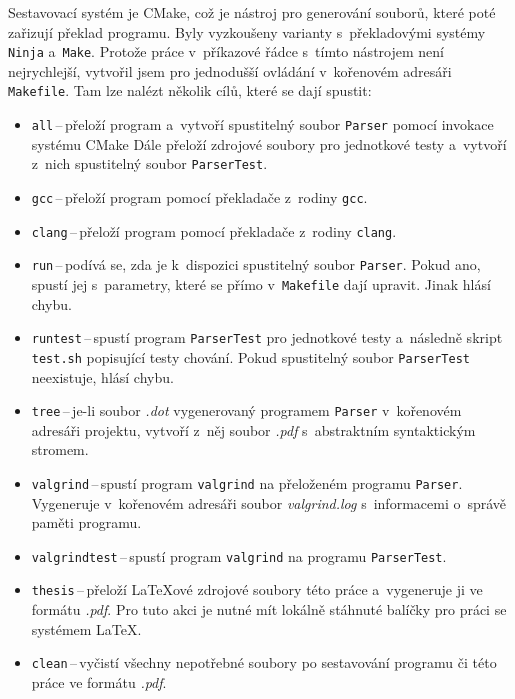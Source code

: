 Sestavovací systém je CMake, což je nástroj pro generování souborů, které poté zařizují překlad programu.
Byly vyzkoušeny varianty s~překladovými systémy \texttt{Ninja} a~\texttt{Make}.
Protože práce v~příkazové řádce s~tímto nástrojem není nejrychlejší, vytvořil jsem pro jednodušší ovládání v~kořenovém adresáři \texttt{Makefile}.
Tam lze nalézt několik cílů, které se dají spustit:
\begin{itemize}
    \item \texttt{all}\,--\,přeloží program a~vytvoří spustitelný soubor \texttt{Parser} pomocí invokace systému CMake
    Dále přeloží zdrojové soubory pro jednotkové testy a~vytvoří z~nich spustitelný soubor \texttt{ParserTest}.
    \item \texttt{gcc}\,--\,přeloží program pomocí překladače z~rodiny \texttt{gcc}.
    \item \texttt{clang}\,--\,přeloží program pomocí překladače z~rodiny \texttt{clang}.
    \item \texttt{run}\,--\,podívá se, zda je k~dispozici spustitelný soubor \texttt{Parser}. Pokud ano, spustí jej s~parametry, které se přímo v~\texttt{Makefile} dají upravit.
    Jinak hlásí chybu.
    \item \texttt{runtest}\,--\,spustí program \texttt{ParserTest} pro jednotkové testy a~následně skript \texttt{test.sh} popisující testy chování.
    Pokud spustitelný soubor \texttt{ParserTest} neexistuje, hlásí chybu.
    \item \texttt{tree}\,--\,je-li soubor \emph{.dot} vygenerovaný programem \texttt{Parser} v~kořenovém adresáři projektu, vytvoří z~něj soubor \emph{.pdf} s~abstraktním syntaktickým stromem.
    \item \texttt{valgrind}\,--\,spustí program \texttt{valgrind} na přeloženém programu \texttt{Parser}. Vygeneruje v~kořenovém adresáři soubor \emph{valgrind.log} s~informacemi o~správě paměti programu.
    \item \texttt{valgrind\textunderscore test}\,--\,spustí program \texttt{valgrind} na programu \texttt{ParserTest}.
    \item \texttt{thesis}\,--\,přeloží \LaTeX ové zdrojové soubory této práce a~vygeneruje ji ve formátu \emph{.pdf}. 
    Pro tuto akci je nutné mít lokálně stáhnuté balíčky pro práci se systémem \LaTeX.
    \item \texttt{clean}\,--\,vyčistí všechny nepotřebné soubory po sestavování programu či této práce ve formátu \emph{.pdf}.
\end{itemize}

